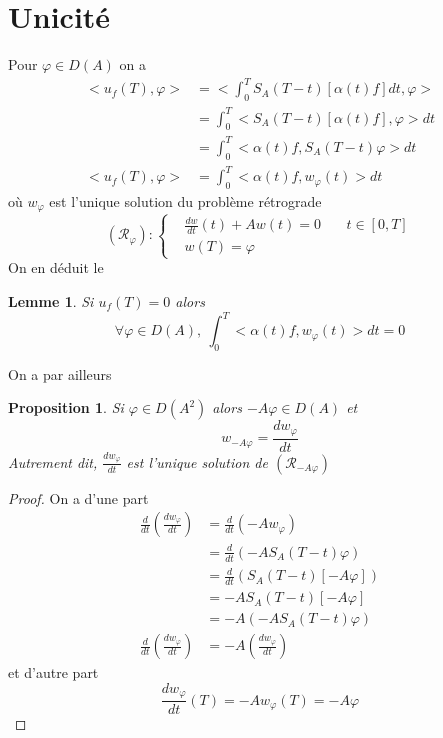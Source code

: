 \documentclass[a4paper]{book}
\newtheorem{prop}{Proposition}[chapter]
\newtheorem{lem}{Lemme}[chapter]
\begin{document}
\section{Unicité}
Pour $\varphi\in D(A)$ on a
\[\begin{aligned}
        <u_f(T),\varphi> & =<\int_{0}^{T}S_A(T-t)[\alpha(t)f]dt,\varphi>  \\
                         & = \int_{0}^{T}<S_A(T-t)[\alpha(t)f],\varphi>dt \\
                         & =\int_{0}^{T}<\alpha(t)f,S_A(T-t)\varphi>dt    \\
        <u_f(T),\varphi> & =\int_{0}^{T}<\alpha(t)f,w_\varphi(t)>dt
    \end{aligned} \]
où $w_\varphi$ est l'unique solution du problème rétrograde
\[(\mathcal{R}_\varphi):\left\lbrace\begin{aligned}
         & \frac{dw}{dt}(t)+A w(t)=0 & \  & t\in[0,T] \\
         & w(T)=\varphi
    \end{aligned}\right. \]
On en déduit le
\begin{lem}
    Si $u_f(T)=0$ alors
    \[\forall \varphi \in D(A),\ \int_{0}^{T}<\alpha(t)f,w_\varphi(t)>dt=0 \]
\end{lem}

On a par ailleurs

\begin{prop}\label{r1}
    Si $\varphi\in D(A^2)$ alors $-A\varphi\in D(A)$ et
    \begin{equation}
        w_{-A\varphi}=\frac{dw_\varphi}{dt}
    \end{equation}
    Autrement dit, $\frac{dw_\varphi}{dt}$ est l'unique solution de $(\mathcal{R}_{-A\varphi})$
\end{prop}

\begin{proof}

    On a d'une part\[\begin{aligned}
            \frac{d}{dt}\left(\frac{dw_\varphi}{dt}\right) & =\frac{d}{dt}\left(-A w_\varphi\right)          \\
                                                           & =\frac{d}{dt}\left(-A S_A(T-t)\varphi \right)   \\
                                                           & =\frac{d}{dt}\left( S_A(T-t)[-A\varphi] \right) \\
                                                           & =-A  S_A(T-t)[-A\varphi]                        \\
                                                           & =-A\left(-A S_A(T-t)\varphi\right)              \\
            \frac{d}{dt}\left(\frac{dw_\varphi}{dt}\right) & =-A\left(\frac{dw_\varphi}{dt} \right)
        \end{aligned} \]
    et d'autre part
    \[\frac{dw_\varphi}{dt}(T)=-A w_\varphi(T) = -A\varphi \]
\end{proof}
\end{document}
